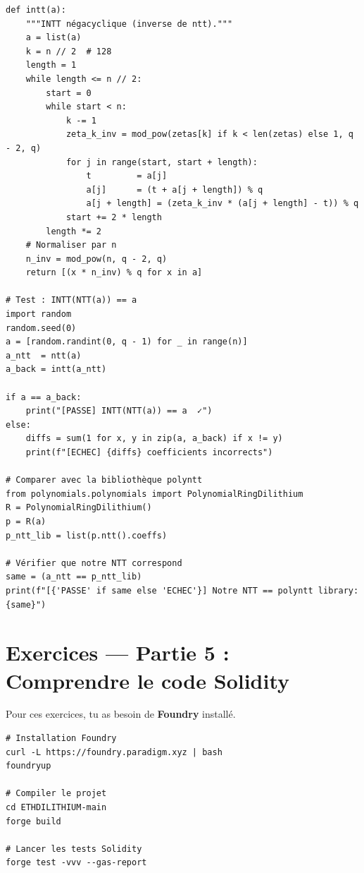 \documentclass[12pt, a4paper]{article}
\begin{document}
\begin{solution}
\begin{lstlisting}[style=python]
def intt(a):
    """INTT négacyclique (inverse de ntt)."""
    a = list(a)
    k = n // 2  # 128
    length = 1
    while length <= n // 2:
        start = 0
        while start < n:
            k -= 1
            zeta_k_inv = mod_pow(zetas[k] if k < len(zetas) else 1, q - 2, q)
            for j in range(start, start + length):
                t         = a[j]
                a[j]      = (t + a[j + length]) % q
                a[j + length] = (zeta_k_inv * (a[j + length] - t)) % q
            start += 2 * length
        length *= 2
    # Normaliser par n
    n_inv = mod_pow(n, q - 2, q)
    return [(x * n_inv) % q for x in a]

# Test : INTT(NTT(a)) == a
import random
random.seed(0)
a = [random.randint(0, q - 1) for _ in range(n)]
a_ntt  = ntt(a)
a_back = intt(a_ntt)

if a == a_back:
    print("[PASSE] INTT(NTT(a)) == a  ✓")
else:
    diffs = sum(1 for x, y in zip(a, a_back) if x != y)
    print(f"[ECHEC] {diffs} coefficients incorrects")

# Comparer avec la bibliothèque polyntt
from polynomials.polynomials import PolynomialRingDilithium
R = PolynomialRingDilithium()
p = R(a)
p_ntt_lib = list(p.ntt().coeffs)

# Vérifier que notre NTT correspond
same = (a_ntt == p_ntt_lib)
print(f"[{'PASSE' if same else 'ECHEC'}] Notre NTT == polyntt library: {same}")
\end{lstlisting}
\end{solution}

\newpage
\section{Exercices --- Partie 5 : Comprendre le code Solidity}

\begin{warningbox}
Pour ces exercices, tu as besoin de \textbf{Foundry} installé.
\begin{lstlisting}[style=bash]
# Installation Foundry
curl -L https://foundry.paradigm.xyz | bash
foundryup

# Compiler le projet
cd ETHDILITHIUM-main
forge build

# Lancer les tests Solidity
forge test -vvv --gas-report
\end{lstlisting}
\end{warningbox}
\end{document}
